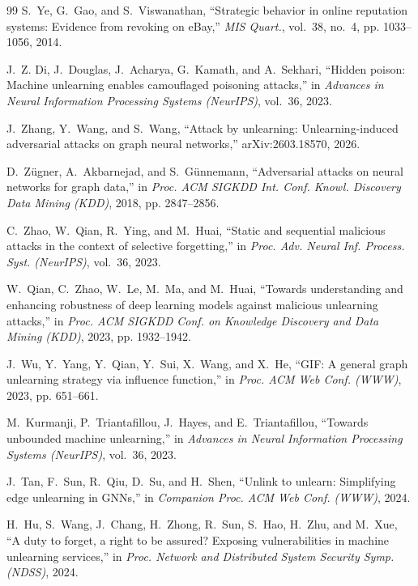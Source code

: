 \documentclass[lettersize,journal]{IEEEtran}
\begin{document}
\begin{thebibliography}{99}
S.~Ye, G.~Gao, and S.~Viswanathan, ``Strategic behavior in online reputation systems: Evidence from revoking on {eBay},'' \emph{MIS Quart.}, vol.~38, no.~4, pp. 1033--1056, 2014.

J.~Z. Di, J.~Douglas, J.~Acharya, G.~Kamath, and A.~Sekhari, ``Hidden poison:
  Machine unlearning enables camouflaged poisoning attacks,'' in \emph{Advances in
  Neural Information Processing Systems (NeurIPS)}, vol.~36, 2023.

J.~Zhang, Y.~Wang, and S.~Wang, ``Attack by unlearning: Unlearning-induced adversarial attacks on graph neural networks,'' arXiv:2603.18570, 2026.

D.~Z{\"u}gner, A.~Akbarnejad, and S.~G{\"u}nnemann, ``Adversarial attacks on neural networks for graph data,'' in \emph{Proc. ACM SIGKDD Int. Conf. Knowl. Discovery Data Mining (KDD)}, 2018, pp. 2847--2856.

C.~Zhao, W.~Qian, R.~Ying, and M.~Huai, ``Static and sequential malicious attacks in the context of selective forgetting,'' in \emph{Proc. Adv. Neural Inf. Process. Syst. (NeurIPS)}, vol.~36, 2023.

W.~Qian, C.~Zhao, W.~Le, M.~Ma, and M.~Huai, ``Towards understanding and
  enhancing robustness of deep learning models against malicious unlearning
  attacks,'' in \emph{Proc. ACM SIGKDD Conf. on Knowledge
  Discovery and Data Mining (KDD)}, 2023, pp. 1932--1942.

J.~Wu, Y.~Yang, Y.~Qian, Y.~Sui, X.~Wang, and X.~He, ``{GIF}: A general graph
  unlearning strategy via influence function,'' in \emph{Proc. ACM
  Web Conf. (WWW)}, 2023, pp. 651--661.

M.~Kurmanji, P.~Triantafillou, J.~Hayes, and E.~Triantafillou, ``Towards
  unbounded machine unlearning,'' in \emph{Advances in Neural Information
  Processing Systems (NeurIPS)}, vol.~36, 2023.

J.~Tan, F.~Sun, R.~Qiu, D.~Su, and H.~Shen, ``Unlink to unlearn: Simplifying edge unlearning in {GNNs},'' in \emph{Companion Proc. ACM Web Conf. (WWW)}, 2024.

H.~Hu, S.~Wang, J.~Chang, H.~Zhong, R.~Sun, S.~Hao, H.~Zhu, and M.~Xue, ``A
  duty to forget, a right to be assured? Exposing vulnerabilities in machine
  unlearning services,'' in \emph{Proc. Network and Distributed
  System Security Symp. (NDSS)}, 2024.


\end{thebibliography}
\end{document}
